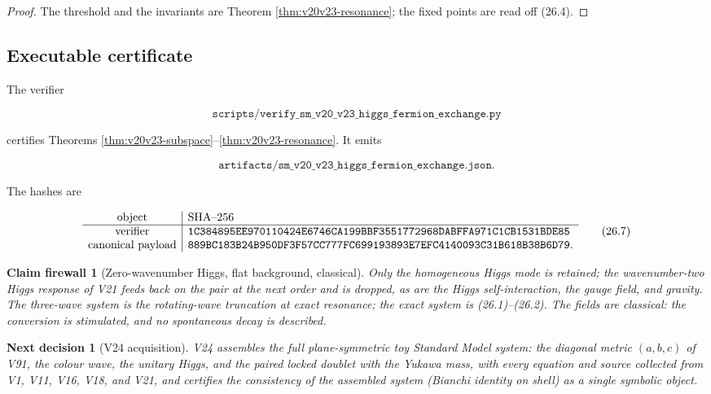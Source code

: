 \documentclass[11pt]{article}
\newtheorem{firewall}[theorem]{Claim firewall}
\newtheorem{decision}[theorem]{Next decision}
\theoremstyle{remark}
\begin{document}
\begin{proof}
The threshold and the invariants are Theorem
\ref{thm:v20v23-resonance}; the fixed points are read off (26.4).
\end{proof}

\subsection{Executable certificate}

The verifier

\[
 \texttt{scripts/verify\_sm\_v20\_v23\_higgs\_fermion\_exchange.py}    \tag{26.5}
\]

certifies Theorems \ref{thm:v20v23-subspace}--\ref{thm:v20v23-resonance}.
It emits

\[
 \texttt{artifacts/sm\_v20\_v23\_higgs\_fermion\_exchange.json}.       \tag{26.6}
\]

The hashes are

\[
\begin{array}{c|l}
\hbox{object}&\hbox{SHA--256}\\ \hline
\hbox{verifier}&
\texttt{1C384895EE970110424E6746CA199BBF3551772968DABFFA971C1CB1531BDE85}\\
\hbox{canonical payload}&
\texttt{889BC183B24B950DF3F57CC777FC699193893E7EFC4140093C31B618B38B6D79}.
\end{array}                                                     \tag{26.7}
\]

\begin{firewall}[Zero-wavenumber Higgs, flat background, classical]
\label{fire:v20v23}
Only the homogeneous Higgs mode is retained; the wavenumber-two
Higgs response of V21 feeds back on the pair at the next order and is
dropped, as are the Higgs self-interaction, the gauge field, and
gravity.  The three-wave system is the rotating-wave truncation at
exact resonance; the exact system is (26.1)--(26.2).  The fields are
classical: the conversion is stimulated, and no spontaneous decay is
described.
\end{firewall}

\begin{decision}[V24 acquisition]
\label{dec:v20v23-next}
V24 assembles the full plane-symmetric toy Standard Model system:
the diagonal metric \((a,b,c)\) of V91, the colour wave, the unitary
Higgs, and the paired locked doublet with the Yukawa mass, with every
equation and source collected from V1, V11, V16, V18, and V21, and
certifies the consistency of the assembled system (Bianchi identity
on shell) as a single symbolic object.
\end{decision}
\end{document}
